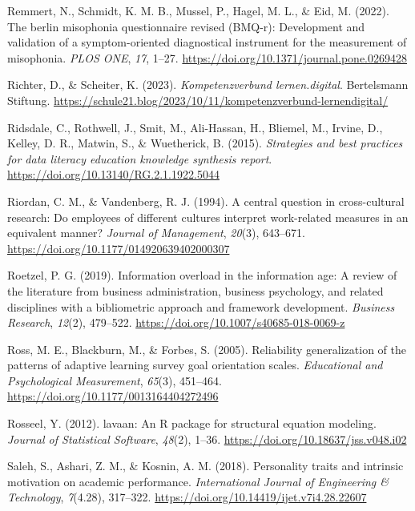 \documentclass[
  12pt,
  a4paper,
  twoside]{article}
\newlength{\cslhangindent}
\newenvironment{CSLReferences}[2] %
 {\begin{list}{}{%
  \setlength{\itemindent}{0pt}
  \setlength{\leftmargin}{0pt}
  \setlength{\parsep}{0pt}
  \ifodd #1
   \setlength{\leftmargin}{\cslhangindent}
   \setlength{\itemindent}{-1\cslhangindent}
  \fi
  \setlength{\itemsep}{#2\baselineskip}}}
 {\end{list}}
\begin{document}
\begin{CSLReferences}{1}{0}
Remmert, N., Schmidt, K. M. B., Mussel, P., Hagel, M. L., \& Eid, M. (2022). The berlin misophonia questionnaire revised (BMQ-r): Development and validation of a symptom-oriented diagnostical instrument for the measurement of misophonia. \emph{PLOS ONE}, \emph{17}, 1--27. \url{https://doi.org/10.1371/journal.pone.0269428}

Richter, D., \& Scheiter, K. (2023). \emph{Kompetenzverbund lernen.digital}. Bertelsmann Stiftung. \url{https://schule21.blog/2023/10/11/kompetenzverbund-lernendigital/}

Ridsdale, C., Rothwell, J., Smit, M., Ali-Hassan, H., Bliemel, M., Irvine, D., Kelley, D. R., Matwin, S., \& Wuetherick, B. (2015). \emph{Strategies and best practices for data literacy education knowledge synthesis report}. \url{https://doi.org/10.13140/RG.2.1.1922.5044}

Riordan, C. M., \& Vandenberg, R. J. (1994). A central question in cross-cultural research: Do employees of different cultures interpret work-related measures in an equivalent manner? \emph{Journal of Management}, \emph{20}(3), 643--671. \url{https://doi.org/10.1177/014920639402000307}

Roetzel, P. G. (2019). Information overload in the information age: A review of the literature from business administration, business psychology, and related disciplines with a bibliometric approach and framework development. \emph{Business Research}, \emph{12}(2), 479--522. \url{https://doi.org/10.1007/s40685-018-0069-z}

Ross, M. E., Blackburn, M., \& Forbes, S. (2005). Reliability generalization of the patterns of adaptive learning survey goal orientation scales. \emph{Educational and Psychological Measurement}, \emph{65}(3), 451--464. \url{https://doi.org/10.1177/0013164404272496}

Rosseel, Y. (2012). {lavaan}: An {R} package for structural equation modeling. \emph{Journal of Statistical Software}, \emph{48}(2), 1--36. \url{https://doi.org/10.18637/jss.v048.i02}

Saleh, S., Ashari, Z. M., \& Kosnin, A. M. (2018). Personality traits and intrinsic motivation on academic performance. \emph{International Journal of Engineering \& Technology}, \emph{7}(4.28), 317--322. \url{https://doi.org/10.14419/ijet.v7i4.28.22607}


\end{CSLReferences}
\end{document}
